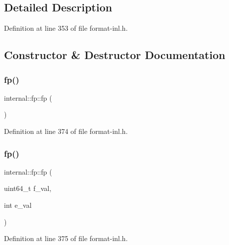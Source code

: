 \subsection{Detailed Description}


Definition at line 353 of file format-\/inl.\+h.



\subsection{Constructor \& Destructor Documentation}
\mbox{\label{classinternal_1_1fp_ac234ddc3b42b32b799a062feda3a56db}} 
\subsubsection{\texorpdfstring{fp()}{fp()}\hspace{0.1cm}{\footnotesize\ttfamily [1/3]}}
{\footnotesize\ttfamily internal\+::fp\+::fp (\begin{DoxyParamCaption}{ }\end{DoxyParamCaption})\hspace{0.3cm}{\ttfamily [inline]}}



Definition at line 374 of file format-\/inl.\+h.

\mbox{\label{classinternal_1_1fp_a6697db0ca32b6662e0a87334e3400ac1}} 
\subsubsection{\texorpdfstring{fp()}{fp()}\hspace{0.1cm}{\footnotesize\ttfamily [2/3]}}
{\footnotesize\ttfamily internal\+::fp\+::fp (\begin{DoxyParamCaption}\item[{uint64\+\_\+t}]{f\+\_\+val,  }\item[{int}]{e\+\_\+val }\end{DoxyParamCaption})\hspace{0.3cm}{\ttfamily [inline]}}



Definition at line 375 of file format-\/inl.\+h.


